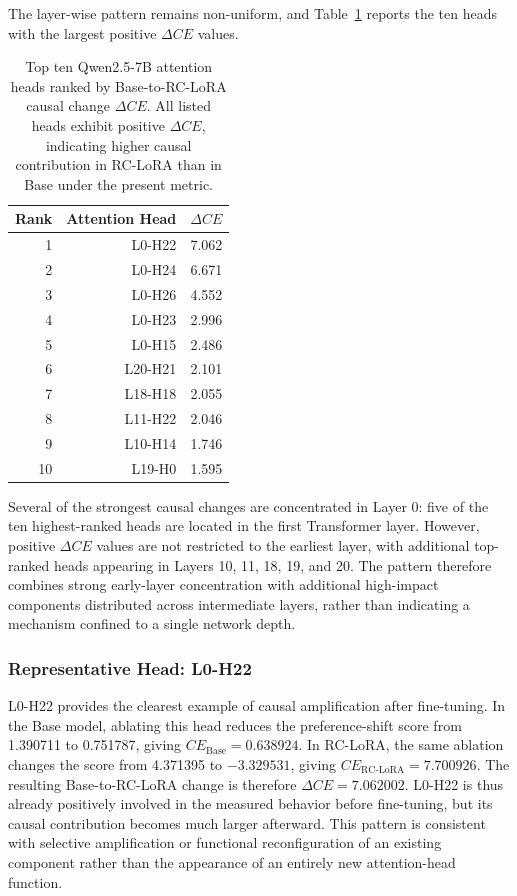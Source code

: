 The layer-wise pattern remains non-uniform, and Table~\ref{tab:top_heads} reports the ten heads with the largest positive $\Delta CE$ values.

\begin{table}[t]
\centering
\caption{Top ten Qwen2.5-7B attention heads ranked by Base-to-RC-LoRA causal change $\Delta CE$. All listed heads exhibit positive $\Delta CE$, indicating higher causal contribution in RC-LoRA than in Base under the present metric.}
\label{tab:top_heads}
\vspace{0.45em}
\begin{tabular}{rrr}
\toprule
\rowcolor{NeutralCell}
Rank & Attention Head & $\Delta CE$ \\
\midrule
1  & L0-H22  & 7.062 \\
2  & L0-H24  & 6.671 \\
3  & L0-H26  & 4.552 \\
4  & L0-H23  & 2.996 \\
5  & L0-H15  & 2.486 \\
6  & L20-H21 & 2.101 \\
7  & L18-H18 & 2.055 \\
8  & L11-H22 & 2.046 \\
9  & L10-H14 & 1.746 \\
10 & L19-H0  & 1.595 \\
\bottomrule
\end{tabular}
\end{table}

Several of the strongest causal changes are concentrated in Layer 0: five of the ten highest-ranked heads are located in the first Transformer layer. However, positive $\Delta CE$ values are not restricted to the earliest layer, with additional top-ranked heads appearing in Layers 10, 11, 18, 19, and 20. The pattern therefore combines strong early-layer concentration with additional high-impact components distributed across intermediate layers, rather than indicating a mechanism confined to a single network depth.

\subsubsection{Representative Head: L0-H22}

L0-H22 provides the clearest example of causal amplification after fine-tuning. In the Base model, ablating this head reduces the preference-shift score from 1.390711 to 0.751787, giving $CE_{\mathrm{Base}}=0.638924$. In RC-LoRA, the same ablation changes the score from 4.371395 to $-3.329531$, giving $CE_{\mathrm{RC\text{-}LoRA}}=7.700926$. The resulting Base-to-RC-LoRA change is therefore $\Delta CE=7.062002$. L0-H22 is thus already positively involved in the measured behavior before fine-tuning, but its causal contribution becomes much larger afterward. This pattern is consistent with selective amplification or functional reconfiguration of an existing component rather than the appearance of an entirely new attention-head function.

